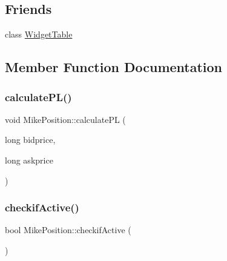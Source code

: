 \subsection*{Friends}
\begin{DoxyCompactItemize}
\item 
class \hyperlink{class_mike_position_abcbb78a2aa9a92d43c9ea7c42cbc681e}{Widget\+Table}
\end{DoxyCompactItemize}


\subsection{Member Function Documentation}
\mbox{\label{class_mike_position_ac0717525b293e8c2b65c515c1d5e191b}} 
\subsubsection{\texorpdfstring{calculate\+P\+L()}{calculatePL()}}
{\footnotesize\ttfamily void Mike\+Position\+::calculate\+PL (\begin{DoxyParamCaption}\item[{long}]{bidprice,  }\item[{long}]{askprice }\end{DoxyParamCaption})\hspace{0.3cm}{\ttfamily [inline]}}

\mbox{\label{class_mike_position_a001a334e6a9945ab9f90cf90577b40ef}} 
\subsubsection{\texorpdfstring{checkif\+Active()}{checkifActive()}}
{\footnotesize\ttfamily bool Mike\+Position\+::checkif\+Active (\begin{DoxyParamCaption}{ }\end{DoxyParamCaption})\hspace{0.3cm}{\ttfamily [inline]}}

\mbox{\label{class_mike_position_a3f6b57b4b2a95da75c7eb9fd5c70a662}} 
